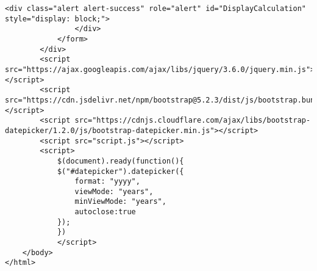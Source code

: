\begin{lstlisting}[style=htmlcssjs]
                <div class="alert alert-success" role="alert" id="DisplayCalculation" style="display: block;">
                </div>
            </form>
        </div>
        <script src="https://ajax.googleapis.com/ajax/libs/jquery/3.6.0/jquery.min.js"></script>
        <script src="https://cdn.jsdelivr.net/npm/bootstrap@5.2.3/dist/js/bootstrap.bundle.min.js"></script>
        <script src="https://cdnjs.cloudflare.com/ajax/libs/bootstrap-datepicker/1.2.0/js/bootstrap-datepicker.min.js"></script>
        <script src="script.js"></script>
        <script>
            $(document).ready(function(){
            $("#datepicker").datepicker({
                format: "yyyy",
                viewMode: "years", 
                minViewMode: "years",
                autoclose:true
            });   
            })
            </script>
    </body>
</html>


\end{lstlisting} 
